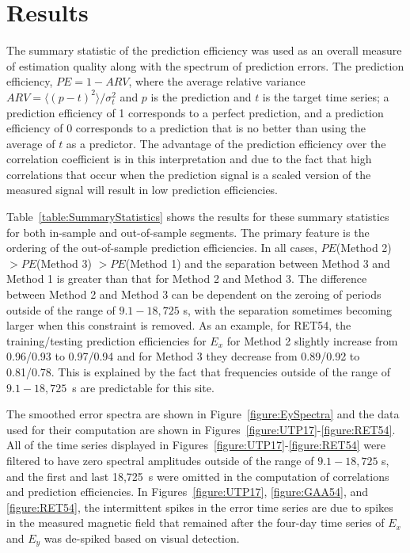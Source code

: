 \documentclass[12pt]{article}
\begin{document}
\section{Results}

The summary statistic of the prediction efficiency was used as an overall measure of estimation quality along with the spectrum of prediction errors.  The prediction efficiency, $PE = 1-ARV$, where the average relative variance $ARV = \langle(p-t)^2\rangle/\sigma_{t}^2$ and $p$ is the prediction and $t$ is the target time series; a prediction efficiency of 1 corresponds to a perfect prediction, and a prediction efficiency of 0 corresponds to a prediction that is no better than using the average of $t$ as a predictor.  The advantage of the prediction efficiency over the correlation coefficient is in this interpretation and due to the fact that high correlations that occur when the prediction signal is a scaled version of the measured signal will result in low prediction efficiencies.

Table~\ref{table:SummaryStatistics} shows the results for these summary statistics for both in-sample and out-of-sample segments.  The primary feature is the ordering of the out-of-sample prediction efficiencies.  In all cases, 
$PE$(Method 2) $> PE$(Method 3) $> PE$(Method 1) and the separation between Method 3 and Method 1 is greater than that for Method 2 and Method 3. The difference between Method 2 and Method 3 can be dependent on the zeroing of periods outside of the range of $9.1-18,725$ s, with the separation sometimes becoming larger when this constraint is removed.  As an example, for RET54, the training/testing prediction efficiencies for $E_x$ for Method 2 slightly increase from 0.96/0.93 to 0.97/0.94 and for Method 3 they decrease from 0.89/0.92 to 0.81/0.78.  This is explained by the fact that frequencies outside of the range of $9.1-18,725$~s are predictable for this site.

The smoothed error spectra are shown in Figure~\ref{figure:EySpectra} and the data used for their computation are shown in Figures~\ref{figure:UTP17}-\ref{figure:RET54}.  All of the time series displayed in Figures~\ref{figure:UTP17}-\ref{figure:RET54} were filtered to have zero spectral amplitudes outside of the range of $9.1-18,725$ s, and the first and last 18,725~s were omitted in the computation of correlations and prediction efficiencies.  In Figures~\ref{figure:UTP17}, \ref{figure:GAA54}, and \ref{figure:RET54}, the intermittent spikes in the error time series are due to spikes in the measured magnetic field that remained after the four-day time series of $E_x$ and $E_y$ was de-spiked based on visual detection. 
\end{document}
